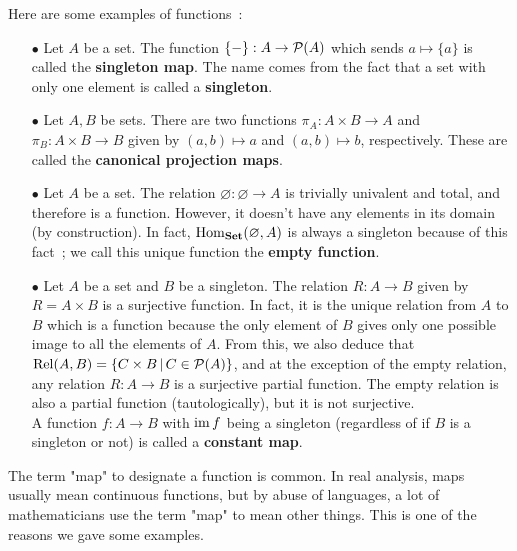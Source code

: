 \begin{example}
	Here are some examples of functions~:
	\\

	\begin{itemize}
		\item[$\bullet$] Let $A$ be a set. The function $\{-\} : A \to \operatorname{\mathcal P}(A)$ which sends $a \mapsto \{a\}$ is called the \textbf{singleton map}. The name comes from the fact that a set with only one element is called a \textbf{singleton}.
		\\

		\item[$\bullet$] Let $A,B$ be sets. There are two functions $\pi_A : A \times B \to A$ and $\pi_B : A \times B \to B$ given by $(a,b) \mapsto a$ and $(a,b) \mapsto b$, respectively. These are called the \textbf{canonical projection maps}.
		\\

		\item[$\bullet$] Let $A$ be a set. The relation $\varnothing : \varnothing \to A$ is trivially univalent and total, and therefore is a function. However, it doesn't have any elements in its domain (by construction). In fact, $\mathrm{Hom}_{\mathbf{Set}}(\varnothing,A)$ is always a singleton because of this fact~; we call this unique function the \textbf{empty function}.
		\\

		\item[$\bullet$] Let $A$ be a set and $B$ be a singleton. The relation $R : A \to B$ given by $R = A \times B$ is a surjective function. In fact, it is the unique relation from $A$ to $B$ which is a function because the only element of $B$ gives only one possible image to all the elements of $A$. From this, we also deduce that $\mathrm{Rel}(A,B) = \{ C \times B \, | \, C \in \operatorname{\mathcal P}(A) \}$, and at the exception of the empty relation, any relation $R : A \to B$ is a surjective partial function. The empty relation is also a partial function (tautologically), but it is not surjective.
		\\
		
		A function $f : A \to B$ with $\operatorname{\mathrm{im}} f$ being a singleton (regardless of if $B$ is a singleton or not) is called a \textbf{constant map}.
	\end{itemize}
\end{example}

\begin{remark}
	The term "map" to designate a function is common. In real analysis, maps usually mean continuous functions, but by abuse of languages, a lot of mathematicians use the term "map" to mean other things. This is one of the reasons we gave some examples.
\end{remark}